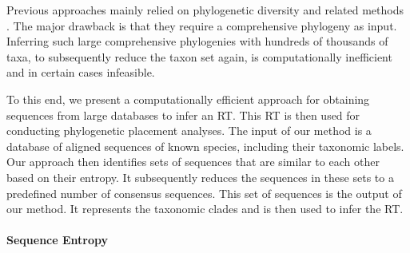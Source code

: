 Previous approaches mainly relied on phylogenetic diversity
\cite{Faith1992,Pardi2005,Minh2006} and related methods \cite{Matsen2013}.
The major drawback is that they require a comprehensive phylogeny as input.
Inferring such large comprehensive phylogenies with hundreds of thousands of taxa,
to subsequently reduce the taxon set again, is computationally inefficient and in certain cases infeasible.

To this end, we present a computationally efficient approach
for obtaining sequences from large databases to infer an \ac{RT}.
This \ac{RT} is then used for conducting phylogenetic placement analyses.
The input of our method is a database of aligned sequences of known species, including their taxonomic labels.
Our approach then identifies sets of sequences that are similar to each other based on their entropy.
It subsequently reduces the sequences in these sets to a predefined number of consensus sequences.
This set of sequences is the output of our method.
It represents the taxonomic clades and is then used to infer the \ac{RT}.



\paragraph{Sequence Entropy}
\label{ch:AutomaticTrees:sec:Methods:sub:PhAT:par:SequenceEntropy}


